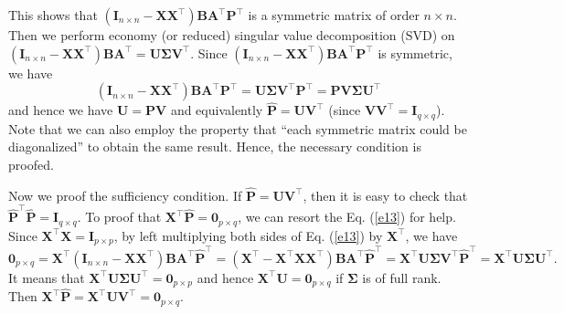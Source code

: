 \documentclass[titlepage,11pt,twoside]{article}
\begin{document}
This shows that $(\mathbf{I}_{n\times n}-\mathbf{X}\mathbf{X}^{\top})\mathbf{B}\mathbf{A}^{\top}\mathbf{P}^{\top}$ is a symmetric matrix of order $n\times n$. Then we perform economy (or reduced) singular value decomposition (SVD) on $(\mathbf{I}_{n\times n}-\mathbf{X}\mathbf{X}^{\top})\mathbf{B}\mathbf{A}^{\top}=\mathbf{U}\mathbf{\Sigma}\mathbf{V}^{\top}$.
Since $(\mathbf{I}_{n\times n}-\mathbf{X}\mathbf{X}^{\top})\mathbf{B}\mathbf{A}^{\top}\mathbf{P}^{\top}$ is symmetric, we have
\begin{equation}\label{e13}
(\mathbf{I}_{n\times n}-\mathbf{X}\mathbf{X}^{\top})\mathbf{B}\mathbf{A}^{\top}\mathbf{P}^{\top}
=
\mathbf{U}\mathbf{\Sigma}\mathbf{V}^{\top}\mathbf{P}^{\top}
=
\mathbf{P}\mathbf{V}\mathbf{\Sigma}\mathbf{U}^{\top}
\end{equation}
and hence we have $\mathbf{U}=\mathbf{P}\mathbf{V}$ and equivalently $\mathbf{\hat{P}}=\mathbf{U}\mathbf{V}^{\top}$ (since $\mathbf{V}\mathbf{V}^{\top}=\mathbf{I}_{q\times q}$). Note that we can also employ the property that ``each symmetric matrix could be diagonalized'' to obtain the same result. Hence, the necessary condition is proofed. 

Now we proof the sufficiency condition. If $\mathbf{\hat{P}}=\mathbf{U}\mathbf{V}^{\top}$, then it is easy to check that $\mathbf{\hat{P}}^{\top}\mathbf{\hat{P}}=\mathbf{I}_{q\times q}$. To proof that $\mathbf{X}^{\top}\mathbf{\hat{P}}=\mathbf{0}_{p\times q}$, we can resort the Eq. (\ref{e13}) for help. Since $\mathbf{X}^{\top}\mathbf{X}=\mathbf{I}_{p\times p}$, by left multiplying both sides of Eq. (\ref{e13}) by $\mathbf{X}^{\top}$, we have  
\begin{equation}
\mathbf{0}_{p\times q}
=
\mathbf{X}^{\top}(\mathbf{I}_{n\times n}-\mathbf{X}\mathbf{X}^{\top})\mathbf{B}\mathbf{A}^{\top}\mathbf{\hat{P}}^{\top}
=
(\mathbf{X}^{\top}-\mathbf{X}^{\top}\mathbf{X}\mathbf{X}^{\top})\mathbf{B}\mathbf{A}^{\top}\mathbf{\hat{P}}^{\top}
=
\mathbf{X}^{\top}\mathbf{U}\mathbf{\Sigma}\mathbf{V}^{\top}\mathbf{\hat{P}}^{\top}
=
\mathbf{X}^{\top}\mathbf{U}\mathbf{\Sigma}\mathbf{U}^{\top}
.
\end{equation}
It means that $\mathbf{X}^{\top}\mathbf{U}\mathbf{\Sigma}\mathbf{U}^{\top}=\mathbf{0}_{p\times p}$ and hence $\mathbf{X}^{\top}\mathbf{U}=\mathbf{0}_{p\times q}$ if $\mathbf{\Sigma}$ is of full rank. Then $\mathbf{X}^{\top}\mathbf{\hat{P}}=\mathbf{X}^{\top}\mathbf{U}\mathbf{V}^{\top}=\mathbf{0}_{p\times q}$.
\end{document}
